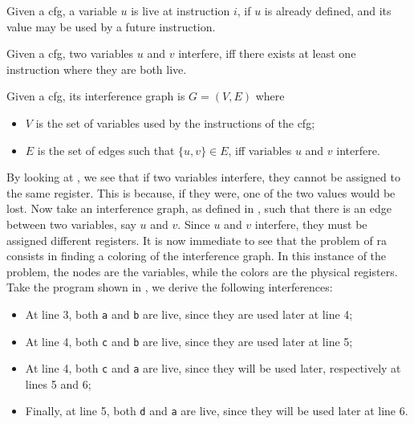 \begin{definition}[Liveness]\label{def:liveness}
  Given a \gls{cfg}, a variable $u$ is live at instruction $i$, if $u$ is already defined, and its value may be used by a future instruction.
\end{definition}

\begin{definition}[Interference]
  Given a \gls{cfg}, two variables $u$ and $v$ interfere, iff there exists at least one instruction where they are both live.
\end{definition}

\begin{definition}\label{def:ig}
  Given a \gls{cfg}, its interference graph is $G = (V, E)$ where
  \begin{itemize}
  \item $V$ is the set of variables used by the instructions of the \gls{cfg};
  \item $E$ is the set of edges such that $\{ u, v \} \in E$, iff variables $u$ and $v$ interfere.
  \end{itemize}
\end{definition}

By looking at , we see that if two variables interfere, they cannot be assigned to the same register. This is because, if they were, one of the two values would be lost.
Now take an interference graph, as defined in , such that there is an edge between two variables, say $u$ and $v$. Since $u$ and $v$ interfere, they must be assigned different registers.
It is now immediate to see that the problem of \gls{ra} consists in finding a coloring of the interference graph. In this instance of the problem, the nodes are the variables, while the colors are the physical registers.
Take the program shown in , we derive the following interferences:
\begin{itemize}
  \item At line 3, both \texttt a and \texttt b are live, since they are used later at line 4;
  \item At line 4, both \texttt c and \texttt b are live, since they are used later at line 5;
  \item At line 4, both \texttt c and \texttt a are live, since they will be used later, respectively at lines 5 and 6;
  \item Finally, at line 5, both \texttt d and \texttt a are live, since they will be used later at line 6.
\end{itemize}

